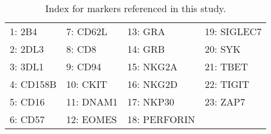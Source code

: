 \documentclass[11pt]{article} %
\begin{document}
\begin{table}[H]
  \begin{center}
    \begin{tabular}{|l|l|l|l|}
      \hline
      1: 2B4    & 7: CD62L  & 13: GRA       & 19: SIGLEC7 \\
      2: 2DL3   & 8: CD8    & 14: GRB       & 20: SYK     \\
      3: 3DL1   & 9: CD94   & 15: NKG2A     & 21: TBET    \\
      4: CD158B & 10: CKIT  & 16: NKG2D     & 22: TIGIT   \\
      5: CD16   & 11: DNAM1 & 17: NKP30     & 23: ZAP7    \\
      6: CD57   & 12: EOMES & 18: PERFORIN  &             \\
      \hline
    \end{tabular} 
  \end{center}
  \caption{Index for markers referenced in this study.}
  \label{tab:markers}
\end{table}
\end{document}
